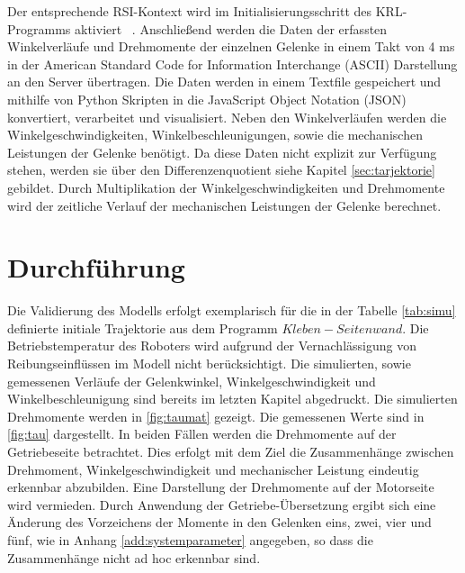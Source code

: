%
Der entsprechende RSI-Kontext wird im Initialisierungsschritt des KRL-Programms aktiviert ~\cite[S.~50]{RSI.2020}. Anschließend werden die Daten der erfassten Winkelverläufe und Drehmomente der einzelnen Gelenke in einem Takt von 4 ms in der American Standard Code for Information Interchange (ASCII) Darstellung an den Server übertragen. Die Daten werden in einem Textfile gespeichert und mithilfe von Python Skripten in die JavaScript Object Notation (JSON) konvertiert, verarbeitet und visualisiert. 
%
Neben den Winkelverläufen werden die Winkelgeschwindigkeiten, Winkelbeschleunigungen, sowie die mechanischen Leistungen der Gelenke benötigt. Da diese Daten nicht explizit zur Verfügung stehen, werden sie über den Differenzenquotient siehe Kapitel \ref{sec:tarjektorie} gebildet. Durch Multiplikation der Winkelgeschwindigkeiten und Drehmomente wird der zeitliche Verlauf der mechanischen Leistungen der Gelenke berechnet.

\section{Durchführung}
Die Validierung des Modells erfolgt exemplarisch für die in der Tabelle \ref{tab:simu} definierte initiale Trajektorie aus dem Programm $Kleben-Seitenwand$. Die Betriebstemperatur des Roboters wird aufgrund der Vernachlässigung von Reibungseinflüssen im Modell nicht berücksichtigt. Die simulierten, sowie gemessenen Verläufe der Gelenkwinkel, Winkelgeschwindigkeit und Winkelbeschleunigung sind bereits im letzten Kapitel abgedruckt. Die simulierten Drehmomente werden in \ref{fig:taumat} gezeigt. Die gemessenen Werte sind in \ref{fig:tau} dargestellt. In beiden Fällen werden die Drehmomente auf der Getriebeseite betrachtet. Dies erfolgt mit dem Ziel die Zusammenhänge zwischen Drehmoment, Winkelgeschwindigkeit und mechanischer Leistung eindeutig erkennbar abzubilden. Eine Darstellung der Drehmomente auf der Motorseite wird vermieden. Durch Anwendung der Getriebe-Übersetzung ergibt sich eine Änderung des Vorzeichens der Momente in den Gelenken eins, zwei, vier und fünf, wie in Anhang \ref{add:systemparameter} angegeben, so dass die Zusammenhänge nicht ad hoc erkennbar sind.

